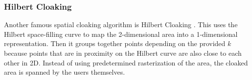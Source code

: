 \subsubsection{Hilbert Cloaking}
Another famous spatial cloaking algorithm is Hilbert Cloaking
. This uses the Hilbert space-filling curve to map the 2-dimensional area into a 1-dimensional representation. Then it groups together points depending on the provided \(k\) because points that are in proximity on the Hilbert curve are also close to each other in 2D. Instead of using predetermined rasterization of the area, the cloaked area is spanned by the users themselves.

